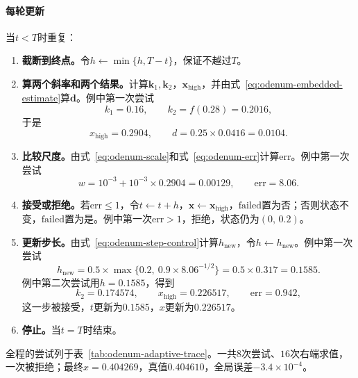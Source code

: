 \paragraph{每轮更新}
当$t<T$时重复：
\begin{enumerate}

 \item \textbf{截断到终点。}令$h\leftarrow\min\{h,T-t\}$，保证不越过$T$。

 \item \textbf{算两个斜率和两个结果。}计算$\bm{k}_1,\bm{k}_2$，$\bm{x}_{\mathrm{high}}$，并由式~\eqref{eq:odenum-embedded-estimate}算$\bm{d}$。例中第一次尝试
 \[
  k_1=0.16,\qquad k_2=f(0.28)=0.2016,
 \]
 于是
 \[
  x_{\mathrm{high}}=0.2904,\qquad d=0.25\times0.0416=0.0104.
 \]

 \item \textbf{比较尺度。}由式~\eqref{eq:odenum-scale}和式~\eqref{eq:odenum-err}计算$\mathrm{err}$。例中第一次尝试
 \[
  w=10^{-3}+10^{-3}\times0.2904=0.00129,\qquad \mathrm{err}=8.06.
 \]

 \item \textbf{接受或拒绝。}若$\mathrm{err}\leq1$，令$t\leftarrow t+h$，$\bm{x}\leftarrow\bm{x}_{\mathrm{high}}$，$\mathrm{failed}$置为否；否则状态不变，$\mathrm{failed}$置为是。例中第一次$\mathrm{err}>1$，拒绝，状态仍为$(0,\,0.2)$。

 \item \textbf{更新步长。}由式~\eqref{eq:odenum-step-control}计算$h_{\mathrm{new}}$，令$h\leftarrow h_{\mathrm{new}}$。例中第一次尝试
 \[
  h_{\mathrm{new}}=0.5\times\max\bigl\{0.2,\ 0.9\times8.06^{-1/2}\bigr\}=0.5\times0.317=0.1585.
 \]
 例中第二次尝试用$h=0.1585$，得到
 \[
  k_2=0.174574,\qquad x_{\mathrm{high}}=0.226517,\qquad \mathrm{err}=0.942,
 \]
 这一步被接受，$t$更新为$0.1585$，$x$更新为$0.226517$。

 \item \textbf{停止。}当$t=T$时结束。
\end{enumerate}
全程的尝试列于表~\ref{tab:odenum-adaptive-trace}。一共$8$次尝试、$16$次右端求值，一次被拒绝；最终$x=0.404269$，真值$0.404610$，全局误差$-3.4\times10^{-4}$。

